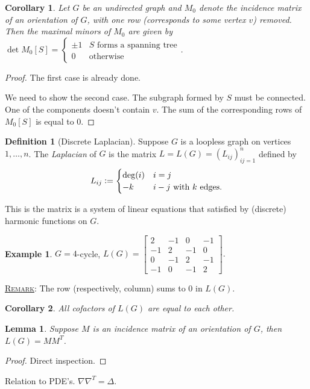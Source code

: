\documentclass{report}
\newcommand{\defeq}{\vcentcolon=}
\newcommand{\fancyem}[1]{\underline{\textsc{#1}}}
\newtheorem{corollary}{Corollary}[section]
\newtheorem{lemma}{Lemma}[section]
\theoremstyle{definition}
\newtheorem{definition}{Definition}[section]
\newtheorem{example}{Example}[section]
\theoremstyle{remark}
\numberwithin{equation}{section}
\begin{document}
\begin{corollary}
    Let $G$ be an undirected graph and $M_0$ denote the incidence matrix of an orientation of $G$, with one row (corresponds to some vertex $v$) removed. Then the maximal minors of $M_0$ are given by $\det M_0[S] = \begin{cases}
        \pm 1 & S \text{ forms a spanning tree} \\
        0 & \text{otherwise}
    \end{cases}$.
\end{corollary}
\begin{proof}
    The first case is already done.

    We need to show the second case. The subgraph formed by $S$ must be connected. One of the components doesn't contain $v$. The sum of the corresponding rows of $M_0[S]$ is equal to $0$.
\end{proof}


\begin{definition}[Discrete Laplacian]
    Suppose $G$ is a loopless graph on vertices $1, \ldots, n$. The \emph{Laplacian} of $G$ is the matrix $L = L(G) = (L_{ij})_{ij=1}^n$ defined by
    \[
    L_{ij} \defeq \begin{cases}
        \deg(i) & i = j \\
        -k & i - j \text{ with $k$ edges}.
    \end{cases}    
    \]
\end{definition}
This is the matrix is a system of linear equations that satisfied by (discrete) harmonic functions on $G$.
\begin{example}
    $G = 4$-cycle, $L(G) = \begin{bmatrix}
        2 & -1 & 0 & -1 \\
        -1 & 2 & -1 & 0 \\
        0 & -1 & 2 & -1 \\
        -1 & 0 & -1 & 2
    \end{bmatrix}.$
\end{example}

\fancyem{Remark}: The row (respectively, column) sums to $0$ in $L(G)$.
\begin{corollary}
    All cofactors of $L(G)$ are equal to each other.
\end{corollary}

\begin{lemma}
    Suppose $M$ is an incidence matrix of an orientation of $G$, then $L(G) = MM^T$.
\end{lemma}
\begin{proof}
    Direct inspection.
\end{proof}
Relation to PDE's. $\nabla\nabla^T = \Delta$.
\end{document}
